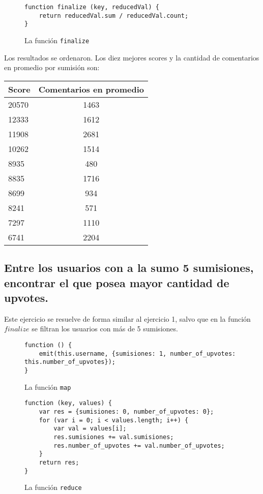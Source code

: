 \documentclass[11pt, a4paper, twoside]{article}
\begin{document}
\begin{figure}[H]
\caption{La función \texttt{finalize}}
\centering
\begin{verbatim}
function finalize (key, reducedVal) {
    return reducedVal.sum / reducedVal.count;
}
\end{verbatim}
\end{figure}

Los resultados se ordenaron. Los diez mejores scores y la cantidad de comentarios en promedio por sumisión son:

\begin{center}
  \begin{tabular}{l|c}
    \textbf{Score} & \textbf{Comentarios en promedio} \\ \hline
    20570 & 1463 \\
    12333 & 1612 \\
    11908 & 2681 \\
    10262 & 1514 \\
    8935 & 480 \\
    8835 & 1716 \\
    8699 & 934 \\
    8241 & 571 \\
    7297 & 1110 \\
    6741 & 2204
  \end{tabular}
\end{center}

\subsection{Entre los usuarios con a la sumo 5 sumisiones, encontrar el que posea mayor cantidad de upvotes.}

Este ejercicio se resuelve de forma similar al ejercicio 1, salvo que en la función $finalize$ se filtran los usuarios con más de 5 sumisiones.

\begin{figure}[H]
\caption{La función \texttt{map}}
\centering
\begin{verbatim}
function () {
    emit(this.username, {sumisiones: 1, number_of_upvotes: this.number_of_upvotes});
}
\end{verbatim}
\end{figure}

\begin{figure}[H]
\caption{La función \texttt{reduce}}
\centering
\begin{verbatim}
function (key, values) {
    var res = {sumisiones: 0, number_of_upvotes: 0};
    for (var i = 0; i < values.length; i++) {
        var val = values[i];
        res.sumisiones += val.sumisiones;
        res.number_of_upvotes += val.number_of_upvotes;
    }
    return res;
}
\end{verbatim}
\end{figure}
\end{document}
